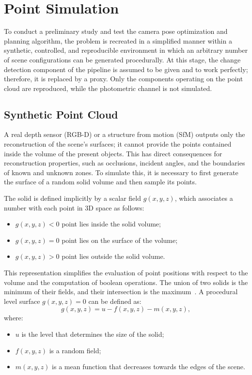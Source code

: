 \section{Point Simulation}
To conduct a preliminary study and test the camera pose optimization and planning algorithm, the problem is recreated in a simplified manner within a synthetic, controlled, and reproducible environment in which an arbitrary number of scene configurations can be generated procedurally. At this stage, the change detection component of the pipeline is assumed to be given and to work perfectly; therefore, it is replaced by a proxy. Only the components operating on the point cloud are reproduced, while the photometric channel is not simulated.

\subsection{Synthetic Point Cloud}
A real depth sensor (RGB-D) or a structure from motion (SfM) outputs only the reconstruction of the scene's surfaces; it cannot provide the points contained inside the volume of the present objects. This has direct consequences for reconstruction properties, such as occlusions, incident angles, and the boundaries of known and unknown zones. To simulate this, it is necessary to first generate the surface of a random solid volume and then sample its points.

The solid is defined implicitly by a scalar field $g(x,y,z)$, which associates a number with each point in 3D space as follows:
\begin{itemize}
  \item $g(x,y,z)<0$ point lies inside the solid volume;
  \item $g(x,y,z)=0$ point lies on the surface of the volume;
  \item $g(x,y,z)>0$ point lies outside the solid volume.
\end{itemize}

This representation simplifies the evaluation of point positions with respect to the volume and the computation of boolean operations. The union of two solids is the minimum of their fields, and their intersection is the maximum~\cite{ricciConstructiveGeometryComputer1973}. A procedural level surface $g(x,y,z)=0$ can be defined as:
\begin{equation}
  g(x,y,z) = u - f(x,y,z) - m(x,y,z),
  \label{eq:level_surface}
\end{equation}
where:
\begin{itemize}
  \item $u$ is the level that determines the size of the solid;
  \item $f(x,y,z)$ is a random field;
  \item $m(x,y,z)$ is a mean function that decreases towards the edges of the scene.
\end{itemize}

